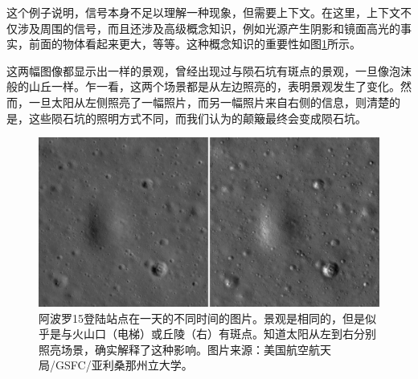 


这个例子说明，信号本身不足以理解一种现象，但需要上下文。在这里，上下文不仅涉及周围的信号，而且还涉及高级概念知识，例如光源产生阴影和镜面高光的事实，前面的物体看起来更大，等等。这种概念知识的重要性如图\ref{fig:craters}所示。

这两幅图像都显示出一样的景观，曾经出现过与陨石坑有斑点的景观，一旦像泡沫般的山丘一样。乍一看，这两个场景都是从左边照亮的，表明景观发生了变化。然而，一旦太阳从左侧照亮了一幅照片，而另一幅照片来自右侧的信息，则清楚的是，这些陨石坑的照明方式不同，而我们认为的颠簸最终会变成陨石坑。


\begin{figure}[!htb]
	\centering
		\includegraphics[width=\textwidth]{figs/craters}
	\caption{阿波罗15登陆站点在一天的不同时间的图片。景观是相同的，但是似乎是与火山口（电梯）或丘陵（右）有斑点。知道太阳从左到右分别照亮场景，确实解释了这种影响。图片来源：美国航空航天局/GSFC/亚利桑那州立大学。
	\label{fig:craters}}
\end{figure}

